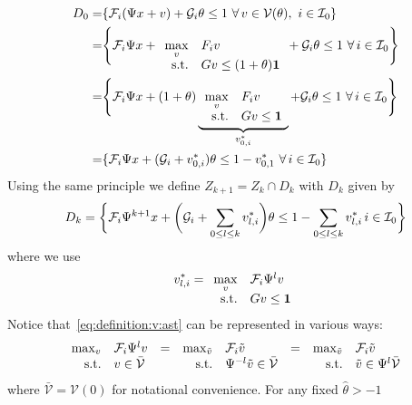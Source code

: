 \documentclass[letterpaper, 10pt, conference]{ieeeconf} %
\begin{document}
\begin{equation}\small
\begin{split}
	D_0 =& \{\mathcal F_i(\Psi x+v) + \mathcal G_i\theta \leq 1 \ \forall\, v\in\mathcal V(\theta), \ i\in\mathcal I_0\}\\
	=&\Biggl\{\mathcal F_i\Psi x + \begin{array}[t]{rl}\displaystyle\max_v& F_i v \\ \text{s.t.}& Gv \leq 
	(1+\theta){\bf{1}} \end{array}
	 + \mathcal G_i \theta \leq 1 \ \forall\, i\in\mathcal I_0\Biggr\}\\
	=&\Biggl\{\mathcal F_i\Psi x + (1+\theta)\underbrace{\begin{array}[t]{rl}\displaystyle\max_v& F_i v \\ 
	\text{s.t.}& Gv \leq {\bf{1}}\end{array}}_{v_{0,i}^\ast}
	 + \mathcal G_i \theta \leq 1 \ \forall\, i\in\mathcal I_0\Biggr\}\\
	=&\{\mathcal F_i\Psi x + (\mathcal G_i + v_{0,i}^\ast)\theta \leq 1 - v_{0,1}^\ast \ \forall \, i\in\mathcal I_0
	\}
\end{split}\end{equation}
%
Using the same principle we define $Z_{k+1}=Z_k\cap D_k$ with $D_k$ given by
%
\begin{equation}\label{eq:parametrised:Dk}\small
	D_k = \biggl\{\mathcal F_i\Psi^{k+1}x+ \biggl(\mathcal G_i +\sum_{0\leq l\leq k} v_{l,i}^\ast\biggr)\theta \leq 1 
	- \sum_{0\leq l\leq k} v_{l,i}^\ast\, i\in\mathcal I_0\biggr\}
\end{equation}
%
where we use 
%
\begin{equation}\label{eq:definition:v:ast}
v_{l,i}^\ast = \begin{array}[t]{rl}\displaystyle\max_v & \mathcal F_i \Psi^{l} v \\ \text{s.t.}& Gv\leq{\bf{1}}
\end{array}
\end{equation}
%
Notice that~\eqref{eq:definition:v:ast} can be represented in various ways:
%
\[
\small
\begin{array}{rlcrlcrl}
\max_v&\mathcal F_i \Psi^l v &=& \max_{\tilde v}&\mathcal F_i \tilde  v &=& \max_{\tilde v}&\mathcal F_i \tilde v \\ 
\text{s.t.}&v\in\bar{\mathcal{V}} & & \text{s.t.}&\Psi^{-l} \tilde v\in\bar{\mathcal{V}} & &
\text{s.t.}& \tilde v\in\Psi^l\bar{\mathcal{V}}
\end{array}
\]
%
where $\bar{\mathcal{V}}=\mathcal V(0)$ for notational convenience. For any fixed $\hat\theta>-1$
\end{document}
